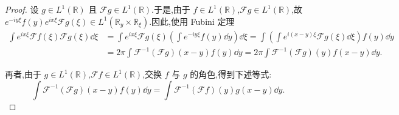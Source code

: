 \begin{proof}
设 $g \in L^{1}(\mathbb{R})$ 且 $\mathcal{F}g \in L^{1}(\mathbb{R})$.于是,由于 $f \in L^{1}(\mathbb{R})$,$\mathcal{F}g \in L^{1}(\mathbb{R})$,故 $e^{-iy\xi}f(y)e^{ix\xi}\mathcal{F}g(\xi) \in L^{1}(\mathbb{R}_{y}\times\mathbb{R}_{\xi})$.因此,使用 Fubini 定理
\begin{align}
\int e^{ix\xi}\mathcal{F}f(\xi)\mathcal{F}g(\xi)\dd\xi
&= \int e^{ix\xi}\mathcal{F}g(\xi)\left(\int e^{-iy\xi}f(y)\dd y\right)\dd\xi = \int\left(\int e^{i(x-y)\xi}\mathcal{F}g(\xi)\dd\xi\right)f(y)\dd y \tag{1.2.3}\label{eq:1.2.3}\\
&= 2\pi\int\mathcal{F}^{-1}(\mathcal{F}g)(x-y)f(y)\dd y = 2\pi\int\mathcal{F}^{-1}(\mathcal{F}g)(y)f(x-y)\dd y. \tag{1.2.5}\label{eq:1.2.5}
\end{align}

再者,由于 $g \in L^{1}(\mathbb{R})$,$\mathcal{F}f \in L^{1}(\mathbb{R})$,交换 $f$ 与 $g$ 的角色,得到下述等式:
\begin{equation}\tag{1.2.6}
\int\mathcal{F}^{-1}(\mathcal{F}g)(x-y)f(y)\dd y = \int\mathcal{F}^{-1}(\mathcal{F}f)(y)g(x-y)\dd y.
\label{eq:1.2.6}\end{equation}


\end{proof}
